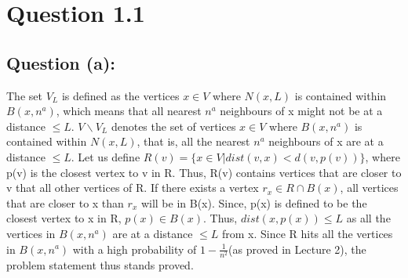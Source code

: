 \documentclass[12pt]{article}
\title{\vspace{-6mm}{ Assignment-1}}
\author{Anannya Mathur 2023SIY7565}
\date{}
\begin{document}
\maketitle
\noindent
\vspace{-10mm}
\section{Question 1.1}
\subsection{Question (a):}

The set $V_L$ is defined as the vertices $x \in V$ where $N(x,L)$ is contained 
within $B(x,n^a)$, which means that all nearest $n^a$ neighbours
of x might not be at a distance $\le L$. $V \backslash V_L$ denotes
the set of vertices $x \in V$ where $B(x,n^a)$ is contained within $N(x,L)$,
that is, all the nearest $n^a$ neighbours
of x are at a distance $\le L$. Let us define $ R(v)= 
\{ x \in V | dist(v,x)<d(v,p(v))\}$, where p(v) is the 
closest vertex to v in R. Thus, R(v) contains vertices that
are closer to v that all other vertices of R. If there exists a
vertex $r_x \in R \cap B(x)$, all vertices that are closer to x 
than $r_x$ will be in B(x). Since, p(x) is defined to be the
closest vertex to x in R, $p(x) \in B(x)$. Thus, $dist(x,p(x))
\le L$ as all the vertices in $B(x,n^a)$ are at a distance $\le L$
from x. Since R hits all the vertices in $B(x,n^a)$ with a high probability
of $1- \frac {1} {n^2}$(as proved in Lecture 2), the problem statement
thus stands proved. 
\end{document}
